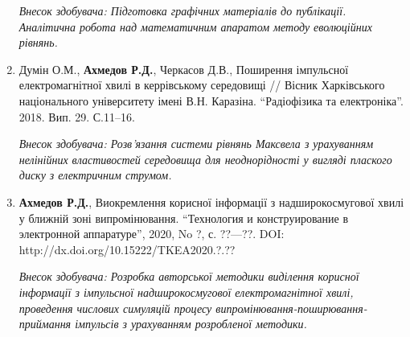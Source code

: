 \begin{enumerate}
\textit{Внесок здобувача: Підготовка графічних матеріалів до публікації. 
Аналітична робота над математичним апаратом методу еволюційних рівнянь.}

\item Думін О.М., \textbf{Ахмедов Р.Д.}, Черкасов Д.В., Поширення імпульсної 
електромагнітної хвилі в керрівському середовищі // Вісник Харківського 
національного університету імені В.Н. Каразіна. ``Радіофізика та 
електроніка''. 2018. Вип. 29. С.11--16.

\textit{Внесок здобувача: Розв'язання системи рівнянь Максвела з урахуванням
нелінійних властивостей середовища для неоднорідності у вигляді плаского 
диску з електричним струмом.}

\item \textbf{Ахмедов Р.Д.}, Виокремлення корисної інформації з 
надширокосмугової хвилі у ближній зоні випромінювання. ``Технология и 
конструирование в электронной аппаратуре'', 2020, No ?, с. ??—??. DOI: 
http://dx.doi.org/10.15222/TKEA2020.?.??

\textit{Внесок здобувача: Розробка авторської методики виділення корисної 
інформації з імпульсної надширокосмугової електромагнітної хвилі, проведення 
числових симуляцій процесу випромінювання-поширювання-приймання імпульсів з
урахуванням розробленої методики.}

\setcounter{ItemsInMyWriting}{\value{enumi}}
\end{enumerate}

